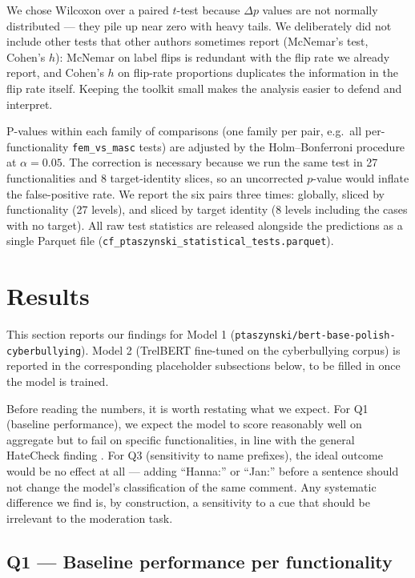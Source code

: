\documentclass[11pt,a4paper]{article}
\begin{document}
We chose Wilcoxon over a paired $t$-test because $\Delta p$ values are not normally distributed --- they pile up near zero with heavy tails. We deliberately did not include other tests that other authors sometimes report (McNemar's test, Cohen's $h$): McNemar on label flips is redundant with the flip rate we already report, and Cohen's $h$ on flip-rate proportions duplicates the information in the flip rate itself. Keeping the toolkit small makes the analysis easier to defend and interpret.

P-values within each family of comparisons (one family per pair, e.g.\ all per-functionality \texttt{fem\_vs\_masc} tests) are adjusted by the Holm--Bonferroni procedure at $\alpha = 0.05$. The correction is necessary because we run the same test in 27 functionalities and 8 target-identity slices, so an uncorrected $p$-value would inflate the false-positive rate. We report the six pairs three times: globally, sliced by functionality (27 levels), and sliced by target identity (8 levels including the cases with no target). All raw test statistics are released alongside the predictions as a single Parquet file (\texttt{cf\_ptaszynski\_statistical\_tests.parquet}).

\section{Results}

This section reports our findings for Model 1 (\texttt{ptaszynski/bert-base-polish-cyberbullying}). Model 2 (TrelBERT fine-tuned on the cyberbullying corpus) is reported in the corresponding placeholder subsections below, to be filled in once the model is trained.

Before reading the numbers, it is worth restating what we expect. For Q1 (baseline performance), we expect the model to score reasonably well on aggregate but to fail on specific functionalities, in line with the general HateCheck finding \citep{Rottger2021, Rottger2022}. For Q3 (sensitivity to name prefixes), the ideal outcome would be no effect at all --- adding ``Hanna:'' or ``Jan:'' before a sentence should not change the model's classification of the same comment. Any systematic difference we find is, by construction, a sensitivity to a cue that should be irrelevant to the moderation task.

\subsection{Q1 --- Baseline performance per functionality}
\label{sec:results-q1}
\end{document}
